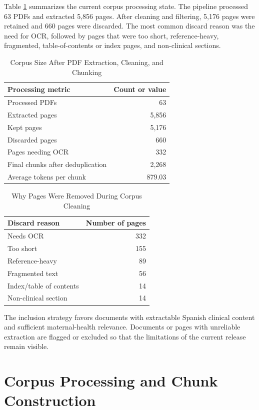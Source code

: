 \documentclass[conference]{IEEEtran}
\begin{document}
Table \ref{tab:corpus_stats} summarizes the current corpus processing state. The pipeline processed 63 PDFs and extracted 5,856 pages. After cleaning and filtering, 5,176 pages were retained and 660 pages were discarded. The most common discard reason was the need for OCR, followed by pages that were too short, reference-heavy, fragmented, table-of-contents or index pages, and non-clinical sections.

\begin{table}[t]
\caption{Corpus Size After PDF Extraction, Cleaning, and Chunking}
\label{tab:corpus_stats}
\centering
\begin{tabular}{|l|r|}
\hline
\textbf{Processing metric} & \textbf{Count or value} \\
\hline
Processed PDFs & 63 \\
Extracted pages & 5,856 \\
Kept pages & 5,176 \\
Discarded pages & 660 \\
Pages needing OCR & 332 \\
Final chunks after deduplication & 2,268 \\
Average tokens per chunk & 879.03 \\
\hline
\end{tabular}
\end{table}

\begin{table}[t]
\caption{Why Pages Were Removed During Corpus Cleaning}
\label{tab:discard_reasons}
\centering
\begin{tabular}{|l|r|}
\hline
\textbf{Discard reason} & \textbf{Number of pages} \\
\hline
Needs OCR & 332 \\
Too short & 155 \\
Reference-heavy & 89 \\
Fragmented text & 56 \\
Index/table of contents & 14 \\
Non-clinical section & 14 \\
\hline
\end{tabular}
\end{table}

The inclusion strategy favors documents with extractable Spanish clinical content and sufficient maternal-health relevance. Documents or pages with unreliable extraction are flagged or excluded so that the limitations of the current release remain visible.

\section{Corpus Processing and Chunk Construction}
\end{document}
